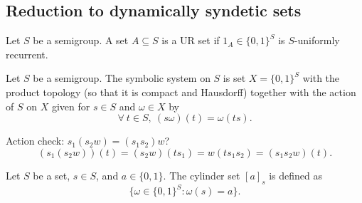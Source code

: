 \subsection{Reduction to dynamically syndetic sets}



\begin{definition}
    \label{def_ur_set}
    \leanok{}
    Let $S$ be a semigroup.  A set $A \subseteq S$ is a UR set if $1_A \in \{0,1\}^S$ is $S$-uniformly recurrent.
\end{definition}

\begin{definition}
\label{def_symbolic_system}
\leanok{}
    Let $S$ be a semigroup.  The symbolic system on $S$ is set $X = \{0,1\}^S$ with the product topology (so that it is compact and Hausdorff) together with the action of $S$ on $X$ given for $s \in S$ and $\omega \in X$ by
    \[\forall \ t \in S, \ (s \omega)(t) = \omega(ts).\]
\end{definition}


Action check: $s_1(s_2w) = (s_1s_2)w$?
\[(s_1(s_2w))(t) = (s_2w)(ts_1) = w(ts_1s_2) = (s_1s_2 w)(t).\]

\begin{definition}
\label{def_cylinder_set}
\leanok{}
    Let $S$ be a set, $s \in S$, and $a \in \{0,1\}$. The cylinder set $[a]_s$ is defined as
    \[\{\omega \in \{0,1\}^{S} : \omega(s) = a\}.\]
\end{definition}

